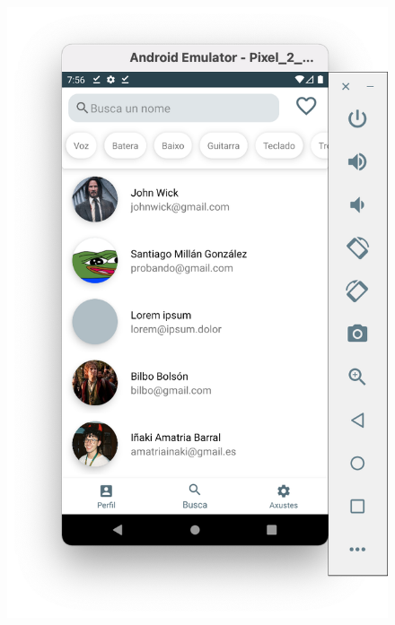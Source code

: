 \documentclass[a4paper,12pt]{article}
\begin{document}
\begin{figure}[H]
	\centering
	\includegraphics[scale=.42]{4.png}
\end{figure}
\end{document}
